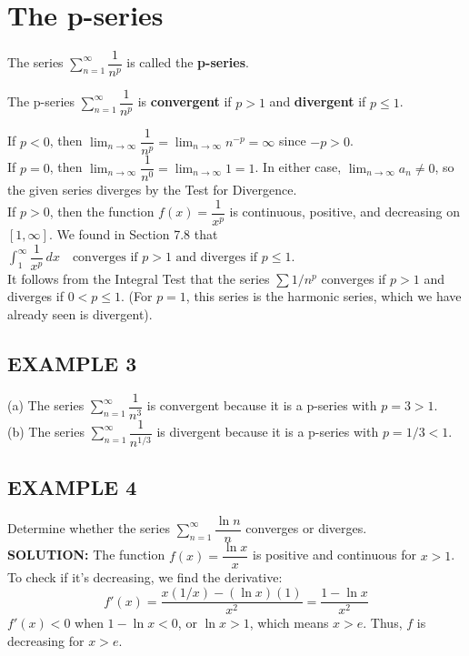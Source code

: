 \documentclass{article}
\theoremstyle{mystyle}
\begin{document}
\section*{The p-series}
The series \( \sum_{n=1}^{\infty} \dfrac{1}{n^p} \) is called the \textbf{p-series}.

\begin{tcolorbox}[
    colback=white,
    colframe=orange!80!white,
    title=Convergence of a p-series,
    boxrule=0.5mm,
    arc=3mm
    ]
    The p-series \( \sum_{n=1}^{\infty} \dfrac{1}{n^p} \) is \textbf{convergent} if \(p > 1\) and \textbf{divergent} if \(p \le 1\).
\end{tcolorbox}

If \(p < 0\), then \( \lim_{n\to\infty} \dfrac{1}{n^p} = \lim_{n\to\infty} n^{-p} = \infty \) since \(-p > 0\).\\
If \(p = 0\), then \( \lim_{n\to\infty} \dfrac{1}{n^0} = \lim_{n\to\infty} 1 = 1 \). In either case, \( \lim_{n\to\infty} a_n \neq 0 \), so the given series diverges by the Test for Divergence.\\
If \(p > 0\), then the function \( f(x) = \dfrac{1}{x^p} \) is continuous, positive, and decreasing on \([1, \infty]\). We found in Section 7.8 that
$ \int_1^\infty \dfrac{1}{x^p} \,dx \quad \text{converges if } p > 1 \text{ and diverges if } p \le 1.$\\
It follows from the Integral Test that the series \( \sum 1/n^p \) converges if \(p > 1\) and diverges if \(0 < p \le 1\). (For \(p=1\), this series is the harmonic series, which we have already seen is divergent).


\subsection*{EXAMPLE 3}
(a) The series \( \sum_{n=1}^{\infty} \dfrac{1}{n^3} \) is convergent because it is a p-series with \(p = 3 > 1\). \\
(b) The series \( \sum_{n=1}^{\infty} \dfrac{1}{n^{1/3}} \) is divergent because it is a p-series with \(p = 1/3 < 1\).\\

\subsection*{EXAMPLE 4}
Determine whether the series \( \sum_{n=1}^{\infty} \dfrac{\ln n}{n} \) converges or diverges.\\
\textbf{SOLUTION:}
The function \(f(x) = \dfrac{\ln x}{x}\) is positive and continuous for \(x>1\). To check if it's decreasing, we find the derivative:
\[ f'(x) = \dfrac{x(1/x) - (\ln x)(1)}{x^2} = \dfrac{1 - \ln x}{x^2} \]
\(f'(x) < 0\) when \(1 - \ln x < 0\), or \(\ln x > 1\), which means \(x > e\). Thus, \(f\) is decreasing for \(x > e\).
\end{document}
